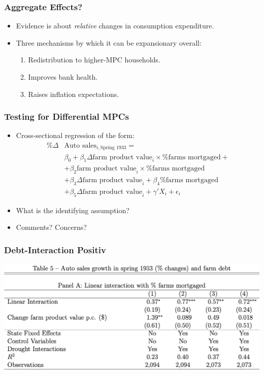 \documentclass[english,xcolor=svgnames]{beamer}
\begin{document}
\begin{frame}
\frametitle[alignment=center]{Aggregate Effects?}
\begin{itemize}
	\item Evidence is about \emph{relative} changes in consumption expenditure.
	\item Three mechanisms by which it can be expansionary overall:
	\begin{enumerate}
		\item Redistribution to higher-MPC households.
		\item Improves bank health.
		\item Raises inflation expectations.
	\end{enumerate}
\end{itemize}
\end{frame}

\begin{frame}
\frametitle[alignment=center]{Testing for Differential MPCs}
\begin{itemize}
	\item Cross-sectional regression of the form:
	\begin{align*}
		\%\Delta &\text{Auto sales}_{i,\text{Spring 1933}} =\\
		&  \beta_0 + \beta_1 \Delta\text{farm product value}_i \times \% \text{farms mortgaged} + \\ 
		&+ \beta_2 \text{farm product value}_i \times \% \text{farms mortgaged} \\
		&+ \beta_3 \Delta\text{farm product value}_i  +\beta_4 \% \text{farms mortgaged} \\
		& + \beta_5 \Delta\text{farm product value}_i  + \gamma'X_i+\epsilon_i
	\end{align*}
	\item What is the identifying assumption?
	\item Comments? Concerns?
\end{itemize}
\end{frame}

\begin{frame}
\frametitle[alignment=center]{Debt-Interaction Positiv}
\centering
\includegraphics[scale=0.4]{figures/HRWTAB5a.png}
\end{frame}
\end{document}
